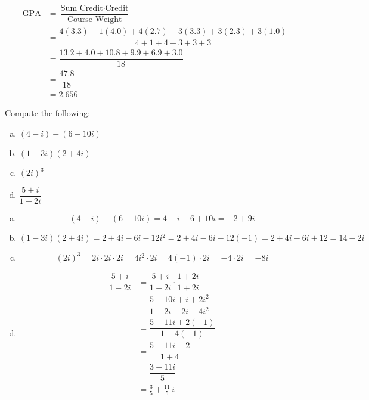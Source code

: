 \documentclass[11pt,letterpaper]{article}
\begin{document}
\sol 
	\[
	\begin{aligned}
	\text{GPA}&= \dfrac{ \text{Sum Credit} \cdot \text{Credit}}{\text{Course Weight}} \\[0.3cm]
	&= \dfrac{4(3.3) + 1(4.0) + 4(2.7) + 3(3.3) + 3(2.3) + 3(1.0)}{4 + 1 + 4 + 3 + 3 + 3} \\[0.3cm]
	&= \dfrac{13.2 + 4.0 + 10.8 + 9.9 + 6.9 + 3.0}{18} \\[0.3cm]
	&= \dfrac{47.8}{18} \\[0.3cm]
	&= 2.656
	\end{aligned}
	\]



\newpage



 Compute the following:
	\begin{enumerate}[(a)]
	\item $(4 - i) - (6 - 10i)$
	\item $(1 - 3i)(2 + 4i)$
	\item $(2i)^3$
	\item $\dfrac{5 + i}{1 - 2i}$
	\end{enumerate} \pspace

\sol
\begin{enumerate}[(a)]
\item 
	\[
	(4 - i) - (6 - 10i)= 4 - i - 6 + 10i= -2 + 9i
	\] \pspace

\item 
	\[
	(1 - 3i)(2 + 4i)= 2 + 4i - 6i - 12i^2= 2 + 4i - 6i - 12(-1)= 2 + 4i - 6i + 12= 14 - 2i
	\] \pspace

\item 
	\[
	(2i)^3= 2i \cdot 2i \cdot 2i= 4i^2 \cdot 2i= 4(-1) \cdot 2i= -4 \cdot 2i= -8i
	\] \pspace

\item 
	\[
	\begin{aligned}
	\dfrac{5 + i}{1 - 2i}&= \dfrac{5 + i}{1 - 2i} \cdot \dfrac{1 + 2i}{1 + 2i} \\[0.3cm]
	&= \dfrac{5 + 10i + i + 2i^2}{1 + 2i - 2i - 4i^2} \\[0.3cm]
	&= \dfrac{5 + 11i + 2(-1)}{1 - 4(-1)} \\[0.3cm]
	&= \dfrac{5 + 11i - 2}{1 + 4} \\[0.3cm]
	&= \dfrac{3 + 11i}{5} \\[0.3cm]
	&= \frac{3}{5} + \frac{11}{5}\,i
	\end{aligned}
	\]
\end{enumerate}
\end{document}
